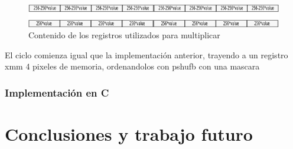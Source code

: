 \documentclass[a4paper]{article}
\begin{document}
\begin{figure}[H]
\centering
\includegraphics[scale=0.8]{imagenes/256value.png}
\caption{Contenido de los registros utilizados para multiplicar}
\label{256value}
\end{figure}

El ciclo comienza igual que la implementación anterior, trayendo a un registro xmm 4 pixeles de memoria, ordenandolos con pshufb con una mascara 



\subsubsection{Implementación en C}


\section{Conclusiones y trabajo futuro}
\end{document}
